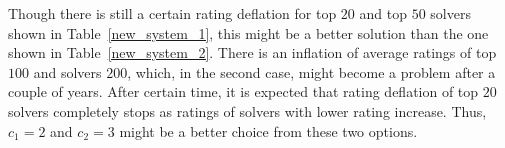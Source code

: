 \documentclass[preprint,12pt]{article}
\begin{document}
Though there is still a certain rating deflation for top $20$ and top $50$
solvers shown in Table~\ref{new_system_1}, this might be a better solution
than the one shown in Table~\ref{new_system_2}.
There is an inflation of average ratings of top $100$ and solvers $200$,
which, in the second case, might become a problem after a couple of years.
After certain time, it is expected that rating deflation of top $20$
solvers completely stops as ratings of solvers with lower rating increase.
Thus, $c_1=2$ and $c_2=3$ might be a better choice from these two options.
\end{document}
